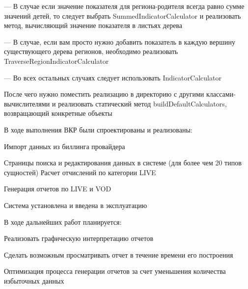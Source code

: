 \documentclass[a4paper]{article}
\begin{document}
--- В случае если значение показателя для региона-родителя всегда равно сумме значений детей, то следует выбрать SummedIndicatorCalculator и реализовать метод, вычисляющий значение показателя в листьях дерева

--- В случае, если вам просто нужно добавить показатель в каждую вершину существующего дерева регионов, необходимо реализовать TraverseRegionIndicatorCalculator

--- Во всех остальных случаях следует использовать IndicatorCalculator

После чего нужно поместить реализацию в директорию с другими классами-вычислителями
и реализовать статический метод buildDefaultCalculators, возвращающий конкретные объекты

\newpage

В ходе выполнения ВКР были спроектированы и реализованы:

Импорт данных из биллинга провайдера

Страницы поиска и редактирования данных в системе (для более чем 20 типов сущностей)
Расчет отчислений по категории LIVE

Генерация отчетов по LIVE и VOD

Система установлена и введена в эксплуатацию

\newpage
В ходе дальнейших работ планируется:

Реализовать графическую интерпретацию отчетов

Сделать возможным просматривать отчет в течение времени его построения

Оптимизация процесса генерации отчетов за счет уменьшения количества избыточных данных
\end{document}
